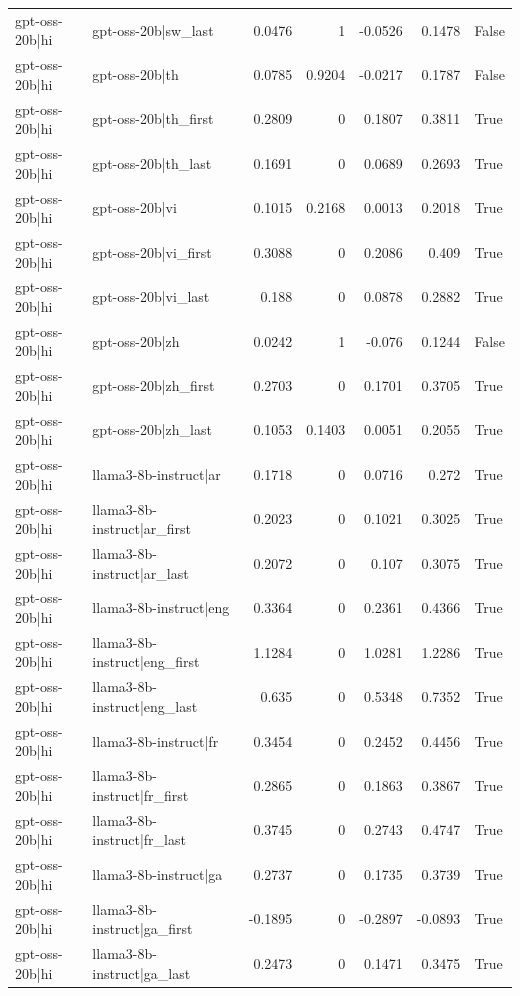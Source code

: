 \begin{table}
\begin{tabular}{l l r r r r l}
gpt-oss-20b|hi & gpt-oss-20b|sw_last & 0.0476 & 1 & -0.0526 & 0.1478 & False \\
gpt-oss-20b|hi & gpt-oss-20b|th & 0.0785 & 0.9204 & -0.0217 & 0.1787 & False \\
gpt-oss-20b|hi & gpt-oss-20b|th_first & 0.2809 & 0 & 0.1807 & 0.3811 & True \\
gpt-oss-20b|hi & gpt-oss-20b|th_last & 0.1691 & 0 & 0.0689 & 0.2693 & True \\
gpt-oss-20b|hi & gpt-oss-20b|vi & 0.1015 & 0.2168 & 0.0013 & 0.2018 & True \\
gpt-oss-20b|hi & gpt-oss-20b|vi_first & 0.3088 & 0 & 0.2086 & 0.409 & True \\
gpt-oss-20b|hi & gpt-oss-20b|vi_last & 0.188 & 0 & 0.0878 & 0.2882 & True \\
gpt-oss-20b|hi & gpt-oss-20b|zh & 0.0242 & 1 & -0.076 & 0.1244 & False \\
gpt-oss-20b|hi & gpt-oss-20b|zh_first & 0.2703 & 0 & 0.1701 & 0.3705 & True \\
gpt-oss-20b|hi & gpt-oss-20b|zh_last & 0.1053 & 0.1403 & 0.0051 & 0.2055 & True \\
gpt-oss-20b|hi & llama3-8b-instruct|ar & 0.1718 & 0 & 0.0716 & 0.272 & True \\
gpt-oss-20b|hi & llama3-8b-instruct|ar_first & 0.2023 & 0 & 0.1021 & 0.3025 & True \\
gpt-oss-20b|hi & llama3-8b-instruct|ar_last & 0.2072 & 0 & 0.107 & 0.3075 & True \\
gpt-oss-20b|hi & llama3-8b-instruct|eng & 0.3364 & 0 & 0.2361 & 0.4366 & True \\
gpt-oss-20b|hi & llama3-8b-instruct|eng_first & 1.1284 & 0 & 1.0281 & 1.2286 & True \\
gpt-oss-20b|hi & llama3-8b-instruct|eng_last & 0.635 & 0 & 0.5348 & 0.7352 & True \\
gpt-oss-20b|hi & llama3-8b-instruct|fr & 0.3454 & 0 & 0.2452 & 0.4456 & True \\
gpt-oss-20b|hi & llama3-8b-instruct|fr_first & 0.2865 & 0 & 0.1863 & 0.3867 & True \\
gpt-oss-20b|hi & llama3-8b-instruct|fr_last & 0.3745 & 0 & 0.2743 & 0.4747 & True \\
gpt-oss-20b|hi & llama3-8b-instruct|ga & 0.2737 & 0 & 0.1735 & 0.3739 & True \\
gpt-oss-20b|hi & llama3-8b-instruct|ga_first & -0.1895 & 0 & -0.2897 & -0.0893 & True \\
gpt-oss-20b|hi & llama3-8b-instruct|ga_last & 0.2473 & 0 & 0.1471 & 0.3475 & True \\

\end{tabular}
\end{table}
